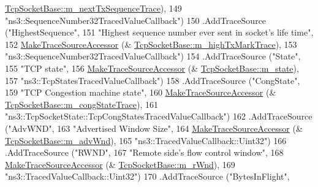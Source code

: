 \begin{DoxyCode}
      \hyperlink{classns3_1_1TcpSocketBase_a4f6e09e3f0132fbf82af53bcd9c49acc}{TcpSocketBase::m\_nextTxSequenceTrace}),
149                      \textcolor{stringliteral}{"ns3::SequenceNumber32TracedValueCallback"})
150     .AddTraceSource (\textcolor{stringliteral}{"HighestSequence"},
151                      \textcolor{stringliteral}{"Highest sequence number ever sent in socket's life time"},
152                      \hyperlink{group__tracing_gab21a770b9855af4e8f69f7531ea4a6b0}{MakeTraceSourceAccessor} (&
      \hyperlink{classns3_1_1TcpSocketBase_abe31167cc73bc1917e616aa210fa1041}{TcpSocketBase::m\_highTxMarkTrace}),
153                      \textcolor{stringliteral}{"ns3::SequenceNumber32TracedValueCallback"})
154     .AddTraceSource (\textcolor{stringliteral}{"State"},
155                      \textcolor{stringliteral}{"TCP state"},
156                      \hyperlink{group__tracing_gab21a770b9855af4e8f69f7531ea4a6b0}{MakeTraceSourceAccessor} (&
      \hyperlink{classns3_1_1TcpSocketBase_a5db6f29272f23546e23320c06a681f3e}{TcpSocketBase::m\_state}),
157                      \textcolor{stringliteral}{"ns3::TcpStatesTracedValueCallback"})
158     .AddTraceSource (\textcolor{stringliteral}{"CongState"},
159                      \textcolor{stringliteral}{"TCP Congestion machine state"},
160                      \hyperlink{group__tracing_gab21a770b9855af4e8f69f7531ea4a6b0}{MakeTraceSourceAccessor} (&
      \hyperlink{classns3_1_1TcpSocketBase_a682c31efa86a22cbffae1f4ba7c0bbc4}{TcpSocketBase::m\_congStateTrace}),
161                      \textcolor{stringliteral}{"ns3::TcpSocketState::TcpCongStatesTracedValueCallback"})
162     .AddTraceSource (\textcolor{stringliteral}{"AdvWND"},
163                      \textcolor{stringliteral}{"Advertised Window Size"},
164                      \hyperlink{group__tracing_gab21a770b9855af4e8f69f7531ea4a6b0}{MakeTraceSourceAccessor} (&
      \hyperlink{classns3_1_1TcpSocketBase_a12a1c017e48895fbe36df0d54a509041}{TcpSocketBase::m\_advWnd}),
165                      \textcolor{stringliteral}{"ns3::TracedValueCallback::Uint32"})
166     .AddTraceSource (\textcolor{stringliteral}{"RWND"},
167                      \textcolor{stringliteral}{"Remote side's flow control window"},
168                      \hyperlink{group__tracing_gab21a770b9855af4e8f69f7531ea4a6b0}{MakeTraceSourceAccessor} (&
      \hyperlink{classns3_1_1TcpSocketBase_af3fafd1671964e0674677be541e1501a}{TcpSocketBase::m\_rWnd}),
169                      \textcolor{stringliteral}{"ns3::TracedValueCallback::Uint32"})
170     .AddTraceSource (\textcolor{stringliteral}{"BytesInFlight"},

\end{DoxyCode}
